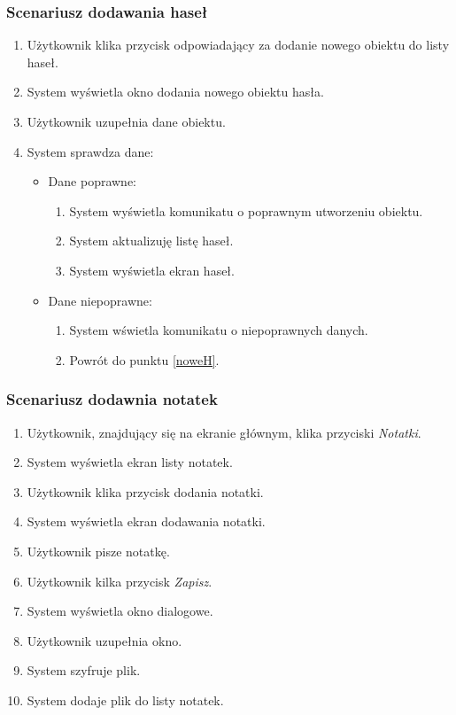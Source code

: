 \documentclass[a4paper]{article}
\begin{document}
\subsubsection{Scenariusz dodawania haseł}
\begin{enumerate}
    \item Użytkownik klika przycisk odpowiadający za dodanie nowego obiektu do listy haseł.
    \item System wyświetla okno dodania nowego obiektu hasła.\label{noweH}
    \item Użytkownik uzupełnia dane obiektu.
    \item System sprawdza dane:
    \begin{itemize}
        \item Dane poprawne:
        \begin{enumerate}
            \item System wyświetla  komunikatu o poprawnym utworzeniu obiektu.
            \item System aktualizuję listę haseł.
            \item System wyświetla ekran haseł.
        \end{enumerate}
        \item Dane niepoprawne:
        \begin{enumerate}
            \item System wświetla komunikatu o niepoprawnych danych.
            \item Powrót do punktu \ref{noweH}.
        \end{enumerate}
    \end{itemize}
\end{enumerate}

\subsubsection{Scenariusz dodawnia notatek} \label{sdn}
\begin{enumerate}
    \item Użytkownik, znajdujący się na ekranie głównym, klika przyciski \textit{Notatki}.
    \item System wyświetla ekran listy notatek.
    \item Użytkownik klika przycisk dodania notatki.
    \item System wyświetla ekran dodawania notatki.
    \item Użytkownik pisze notatkę.
    \item Użytkownik kilka przycisk \textit{Zapisz}.
    \item System wyświetla okno dialogowe. \label{zapiszN}
    \item Użytkownik uzupełnia okno.
    \item System szyfruje plik.
    \item System dodaje plik do listy notatek.
\end{enumerate}
\end{document}
